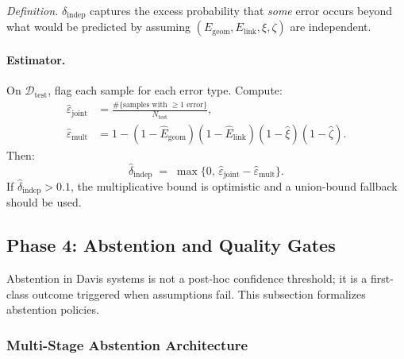 \documentclass[11pt]{article}
\begin{document}
\emph{Definition.} $\delta_{\mathrm{indep}}$ captures the excess probability that \emph{some} error occurs beyond what would be predicted by assuming $(E_{\mathrm{geom}}, E_{\mathrm{link}}, \xi, \zeta)$ are independent.

\paragraph{Estimator.}
On $\mathcal{D}_{\mathrm{test}}$, flag each sample for each error type. Compute:
\begin{align*}
\hat\varepsilon_{\text{joint}}
&= \frac{\#\{\text{samples with } \ge 1 \text{ error}\}}{N_{\mathrm{test}}}, \\
\hat\varepsilon_{\text{mult}}
&= 1 - (1-\hat E_{\mathrm{geom}})(1-\hat E_{\mathrm{link}})(1-\hat\xi)(1-\hat\zeta).
\end{align*}
Then:
\[
\hat\delta_{\mathrm{indep}}
\;=\;
\max\bigl\{0,\, \hat\varepsilon_{\text{joint}} - \hat\varepsilon_{\text{mult}}\bigr\}.
\]
If $\hat\delta_{\mathrm{indep}} > 0.1$, the multiplicative bound is optimistic and a union-bound fallback should be used.

\subsection{Phase 4: Abstention and Quality Gates}
\label{subsec:abstention-gates}

Abstention in Davis systems is not a post-hoc confidence threshold; it is a first-class outcome triggered when assumptions fail. This subsection formalizes abstention policies.

\subsubsection{Multi-Stage Abstention Architecture}
\end{document}
